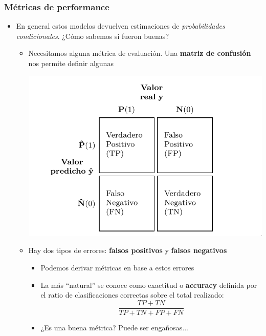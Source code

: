 \documentclass[leqno, 10pt, envcountsect]{beamer}
\numberwithin{equation}{section}
\theoremstyle{definition}
\theoremstyle{example}
\numberwithin{figure}{section}
\numberwithin{table}{section}
\let\olditem\item
\renewcommand{\item}{%
\olditem\vspace{1pt}}
\begin{document}
\begin{frame}[fragile=singleslide]
  \frametitle{Métricas de performance}
  \begin{itemize}
    \item En general estos modelos devuelven estimaciones de
      \textit{probabilidades condicionales}. ¿Cómo sabemos si fueron buenas?
    \begin{itemize}
      \item Necesitamos alguna métrica de evaluación. Una \textbf{matriz de
        confusión} nos permite definir algunas
        \begin{center}
          \includegraphics[scale=0.2]{confusion_matrix.png}
        \end{center}
        \item Hay dos tipos de errores: \textbf{falsos positivos}
          y \textbf{falsos negativos}
          \begin{itemize}
            \item Podemos derivar métricas en base a estos errores
            \item La más \enquote{natural} se conoce como exactitud o
              \textbf{accuracy} definida por el ratio de clasificaciones
              correctas sobre el total realizado:
              \begin{equation*}
                \frac{TP + TN}{TP + TN + FP + FN}
              \end{equation*}
            \item ¿Es una buena métrica? Puede ser engañosas...
          \end{itemize}
    \end{itemize}
  \end{itemize}
\end{frame}
\end{document}
